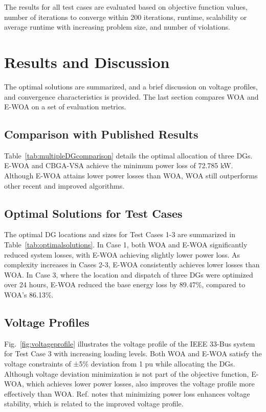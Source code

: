 \documentclass[conference]{IEEEtran}
\begin{document}
The results for all test cases are evaluated based on objective function values, number of iterations to converge within 200 iterations, runtime, scalability or average runtime with increasing problem size, and number of violations.

\section{Results and Discussion}\label{sec:results}
The optimal solutions are summarized, and a brief discussion on voltage profiles, and convergence characteristics is provided. The last section compares WOA and E-WOA on a set of evaluation metrics.

\subsection{Comparison with Published Results}

Table~\ref{tab:multipleDGcomparison} details the optimal allocation of three DGs. E-WOA and CBGA-VSA achieve the minimum power loss of 72.785 kW. Although E-WOA attains lower power losses than WOA, WOA still outperforms other recent and improved algorithms.

\subsection{Optimal Solutions for Test Cases}


The optimal DG locations and sizes for Test Cases 1-3 are summarized in Table~\ref{tab:optimalsolutions}. In Case 1, both WOA and E-WOA significantly reduced system losses, with E-WOA achieving slightly lower power loss. As complexity increases in Cases 2-3, E-WOA consistently achieves lower losses than WOA. In Case 3, where the location and dispatch of three DGs were optimized over 24 hours, E-WOA reduced the base energy loss by 89.47\%, compared to WOA's 86.13\%.

\subsection{Voltage Profiles}

Fig.~\ref{fig:voltageprofile} illustrates the voltage profile of the IEEE 33-Bus system for Test Case 3 with increasing loading levels. Both WOA and E-WOA satisfy the voltage constraints of ±5\% deviation from 1 pu while allocating the DGs. Although voltage deviation minimization is not part of the objective function, E-WOA, which achieves lower power losses, also improves the voltage profile more effectively than WOA. Ref. \cite{kashem} notes that minimizing power loss enhances voltage stability, which is related to the improved voltage profile.
\end{document}
